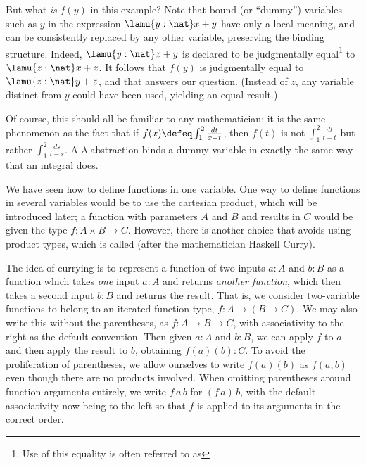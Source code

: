 But what \emph{is} $f(y)$ in this example? Note that bound (or ``dummy'')
variables
%
%
%
%
such as $y$ in the expression $\lamu{y:\nat} x + y$
have only a local meaning, and can be consistently replaced by any
other variable, preserving the binding structure. Indeed, $\lamu{y:\nat} x + y$ is declared to be judgmentally equal\footnote{Use of this equality is often referred to as } to
$\lamu{z:\nat} x + z$.  It follows that 
$f(y)$ is judgmentally equal to  $\lamu{z:\nat} y + z$, and that answers our question.  (Instead of $z$,
any variable distinct from $y$ could have been used, yielding an equal result.)

Of course, this should all be familiar to any mathematician: it is the same phenomenon as the fact that if $f(x) \defeq \int_1^2 \frac{dt}{x-t}$, then $f(t)$ is not $\int_1^2 \frac{dt}{t-t}$ but rather $\int_1^2 \frac{ds}{t-s}$.
A $\lambda$-abstraction binds a dummy variable in exactly the same way that an integral does.

We have seen how to define functions in one variable. One
way to define functions in several variables would be to use the
cartesian product, which will be introduced later; a function with
parameters $A$ and $B$ and results in $C$ would be given the type 
$f : A \times B \to C$. However, there is another choice that avoids
using product types, which is called 
%
%
(after the mathematician Haskell Curry).
%

The idea of currying is to represent a function of two inputs $a:A$ and $b:B$ as a function which takes \emph{one} input $a:A$ and returns \emph{another function}, which then takes a second input $b:B$ and returns the result.
That is, we consider two-variable functions to belong to an iterated function type, $f : A \to (B \to C)$.
We may also write this without the parentheses, as $f : A \to B \to C$, with
associativity to the right as the default convention.  Then given $a : A$ and $b : B$,
we can apply $f$ to $a$ and then apply the result to $b$, obtaining
$f(a)(b) : C$. To avoid the proliferation of parentheses, we allow ourselves to
write $f(a)(b)$ as $f(a,b)$ even though there are no products
involved.
When omitting parentheses around function arguments entirely, we write $f\,a\,b$ for $(f\,a)\,b$, with the default associativity now being to the left so that $f$ is applied to its arguments in the correct order.

